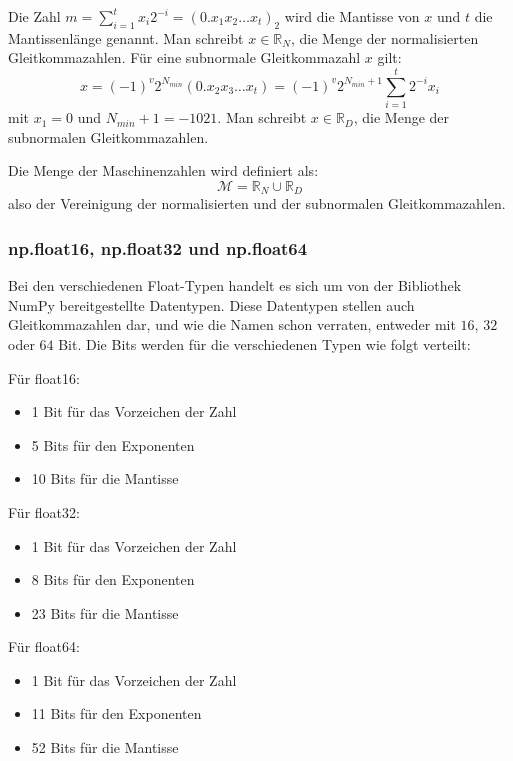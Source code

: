 \documentclass{scrartcl}
\begin{document}
Die Zahl \( m = \sum_{i=1}^{t}x_i 2^{-i} = (0.x_1x_2\ldots x_t)_2 \) wird die
Mantisse von \( x \) und \( t \) die Mantissenlänge genannt.
Man schreibt \( x \in \mathbb{R}_N \), die Menge der normalisierten
Gleitkommazahlen.
Für eine subnormale Gleitkommazahl \( x \) gilt: \[ x = (-1)^v 2^{N_{min}}
    (0.x_2 x_3 \ldots x_t) = (-1)^v 2^{N_{min}+1} \sum_{i=1}^{t} 2^{-i} x_i \] mit
\( x_1 = 0 \) und \( N_{min} + 1 = -1021 \).
Man schreibt \( x \in \mathbb{R}_D \), die Menge der subnormalen
Gleitkommazahlen.

Die Menge der Maschinenzahlen wird definiert als: \[ \mathcal{M} = \mathbb{R}_N
    \cup \mathbb{R}_D \] also der Vereinigung der normalisierten und der
subnormalen Gleitkommazahlen.

\subsubsection{np.float16, np.float32 und np.float64}
Bei den verschiedenen Float-Typen handelt es sich um von der Bibliothek NumPy
bereitgestellte Datentypen.
Diese Datentypen stellen auch Gleitkommazahlen dar, und wie die Namen schon
verraten, entweder mit \( 16 \), \( 32 \) oder \( 64 \) Bit.
Die Bits werden für die verschiedenen Typen wie folgt verteilt:

Für float16:
\begin{itemize}
    \item 1 Bit für das Vorzeichen der Zahl %
    \item 5 Bits für den Exponenten
    \item 10 Bits für die Mantisse
\end{itemize}

Für float32:
\begin{itemize}
    \item 1 Bit für das Vorzeichen der Zahl %
    \item 8 Bits für den Exponenten
    \item 23 Bits für die Mantisse
\end{itemize}

Für float64:
\begin{itemize}
    \item 1 Bit für das Vorzeichen der Zahl
    \item 11 Bits für den Exponenten
    \item 52 Bits für die Mantisse
\end{itemize}
\end{document}
